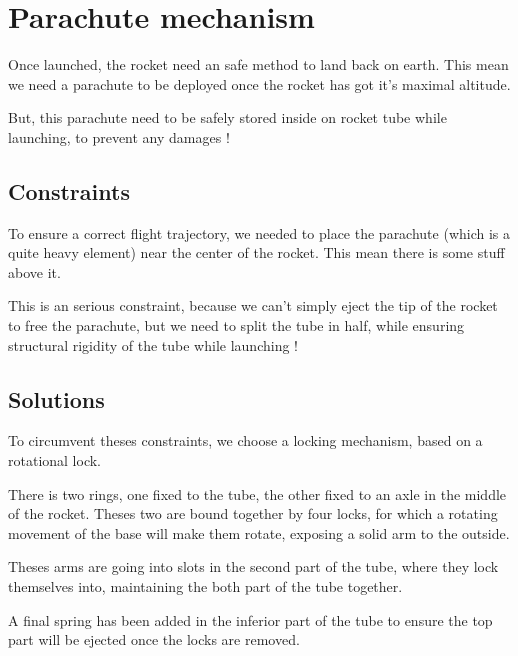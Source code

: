 \section{Parachute mechanism}
Once launched, the rocket need an safe method to land back on earth. This mean
we need a parachute to be deployed once the rocket has got it's maximal altitude.

But, this parachute need to be safely stored inside on rocket tube while launching,
to prevent any damages !

\subsection{Constraints}
To ensure a correct flight trajectory, we needed to place the parachute (which is a quite
heavy element) near the center of the rocket. This mean there is some stuff above it.

This is an serious constraint, because we can't simply eject the tip of the rocket to
free the parachute, but we need to split the tube in half, while ensuring structural
rigidity of the tube while launching !

\subsection{Solutions}
To circumvent theses constraints, we choose a locking mechanism, based on a rotational lock.

There is two rings, one fixed to the tube, the other fixed to an axle in the middle of the
rocket. Theses two are bound together by four locks, for which a rotating movement of the base
will make them rotate, exposing a solid arm to the outside.

Theses arms are going into slots in the second part of the tube, where they lock themselves into,
maintaining the both part of the tube together.

A final spring has been added in the inferior part of the tube to ensure the top part will be
ejected once the locks are removed.